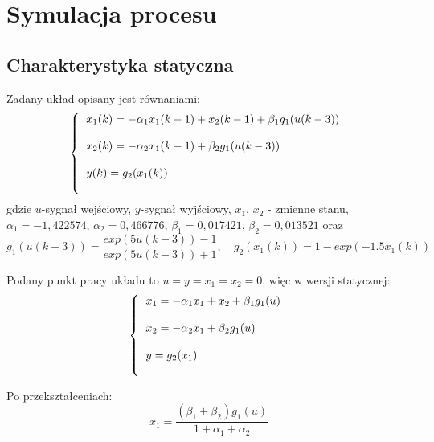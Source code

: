 \chapter{Symulacja procesu}
	\label{ch:sym}
	
	\section{Charakterystyka statyczna}
	\label{sec:stat}
	
		Zadany układ opisany jest równaniami:
		\begin{equation}
		\left\{
		\begin{tabular}{l}
			$x_1(k)= - \alpha_1 x_1(k-1) + x_2(k-1) + \beta_1 g_1(u(k-3))$ \\\\
			$x_2(k)= - \alpha_2 x_1(k-1) + \beta_2 g_1(u(k-3))$\\\\
			$y(k)=g_2(x_1(k))$\\\\
		\end{tabular}
		\right.
		\label{eq:dyskretne}
		\end{equation}
		gdzie $u$-sygnał wejściowy, $y$-sygnał wyjściowy, $x_1$, $x_2$ - zmienne stanu, $\alpha_1 = -1,422574$, $\alpha_2 = 0,466776$, $\beta_1 = 0,017421$, $\beta_2 = 0,013521$ oraz
		\begin{equation}
			g_1(u(k-3))=\frac{exp(5u(k-3))-1}{exp(5u(k-3))+1},\quad g_2(x_1(k))=1-exp(-1.5x_1(k))
		\label{eq:g1g2}
		\end{equation}
		
		Podany punkt pracy układu to $u=y=x_1=x_2=0$, więc w wersji statycznej:
		\begin{equation}
			\left\{
			\begin{tabular}{l}
			$x_1= - \alpha_1 x_1+x_2+ \beta_1 g_1(u)$ \\\\
			$x_2= - \alpha_2 x_1+ \beta_2 g_1(u)$\\\\
			$y=g_2(x_1)$\\\\
			\end{tabular}
			\right.
			\label{eq:statyczne}
		\end{equation}
		
		Po przekształceniach:
		\begin{equation}
			x_1 = \frac{(\beta_1 + \beta_2)g_1(u)}{1+\alpha_1+\alpha_2}
			\label{eq:x1_static}
		\end{equation}
		

